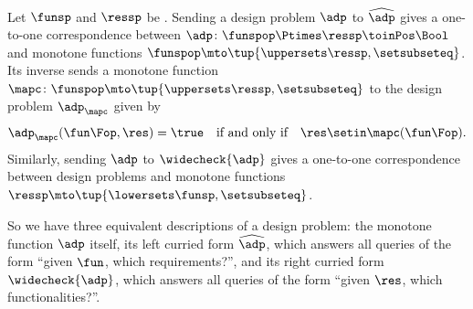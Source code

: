 \begin{proposition}
    \label{prop:dp-currying}
    Let $\funsp$ and $\ressp$ be .
    Sending a design problem $\adp$ to $\widehat{\adp}$ gives a one-to-one correspondence between  $\adp \colon \funspop \Ptimes \ressp \toinPos \Bool$ and monotone functions $\funspop \mto \tup{\uppersets \ressp, \setsubseteq}$.
    Its inverse sends a monotone function $\mapc \colon \funspop \mto \tup{\uppersets \ressp, \setsubseteq}$ to the design problem $\adp_\mapc$ given by
    \begin{equation}
        \adp_\mapc(\fun\Fop, \res) = \true
        \quad \text{if and only if} \quad
        \res \setin \mapc(\fun\Fop).
    \end{equation}
    Similarly, sending $\adp$ to $\widecheck{\adp}$ gives a one-to-one correspondence between design problems and monotone functions $\ressp \mto \tup{\lowersets \funsp, \setsubseteq}$.
\end{proposition}

So we have three equivalent descriptions of a design problem: the monotone function $\adp$ itself, its left curried form $\widehat{\adp}$, which answers all queries of the form ``given $\fun$, which requirements?'', and its right curried form $\widecheck{\adp}$, which answers all queries of the form ``given $\res$, which functionalities?''.

